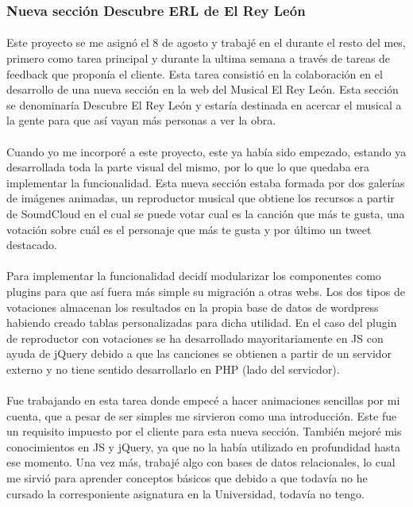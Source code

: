 \documentclass[11pt, a4paper,spanish]{article}
\begin{document}
            \subsubsection{Nueva sección Descubre ERL de El Rey León}

                \paragraph{}
                Este proyecto se me asignó el 8 de agosto y trabajé en el durante el resto del mes, primero como tarea principal y durante la ultima semana a través de tareas de feedback que proponía el cliente. Esta tarea consistió en la colaboración en el desarrollo de una nueva sección en la web del Musical El Rey León. Esta sección se denominaría Descubre El Rey León y estaría destinada en acercar el musical a la gente para que así vayan más personas a ver la obra.

                \paragraph{}
                Cuando yo me incorporé a este proyecto, este ya había sido empezado, estando ya desarrollada toda la parte visual del mismo, por lo que lo que quedaba era implementar la funcionalidad. Esta nueva sección estaba formada por dos galerías  de imágenes animadas, un reproductor musical que obtiene los recursos a partir de SoundCloud en el cual se puede votar cual es la canción que más te gusta, una votación sobre cuál es el personaje que más te gusta y por último un tweet destacado.

                \paragraph{}
                Para implementar la funcionalidad decidí modularizar los componentes como plugins para que así fuera más simple su migración a otras webs. Los dos tipos de votaciones almacenan los resultados en la propia base de datos de wordpress habiendo creado tablas personalizadas para dicha utilidad. En el caso del plugin de reproductor con votaciones se ha desarrollado mayoritariamente en JS con ayuda de jQuery debido a que las canciones se obtienen a partir de un servidor externo y no tiene sentido desarrollarlo en PHP (lado del servicdor).

                \paragraph{}
                Fue trabajando en esta tarea donde empecé a hacer animaciones sencillas por mi cuenta, que a pesar de ser simples me sirvieron como una introducción. Este fue un requisito impuesto por el cliente para esta nueva sección. También mejoré mis conocimientos en JS y jQuery, ya que no la había utilizado en profundidad hasta ese momento. Una vez más, trabajé algo con bases de datos relacionales, lo cual me sirvió para aprender conceptos básicos que debido a que todavía no he cursado la corresponiente asignatura en la Universidad, todavía no tengo.
\end{document}
